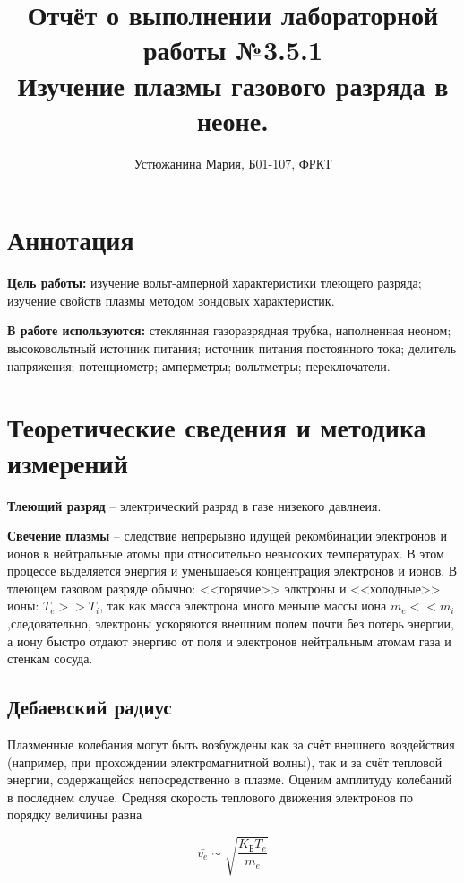 \documentclass [a4paper, 12pt]{article}
\title{Отчёт о выполнении лабораторной работы №3.5.1 \\ {Изучение плазмы газового разряда в неоне.}}
\author{Устюжанина Мария, Б01-107, ФРКТ}
\begin{document}
\maketitle
\newpage

\section{Аннотация}

    
    \textbf{Цель работы:} изучение вольт-амперной характеристики тлеющего разряда; изучение свойств плазмы методом зондовых характеристик.
    
    \textbf{В работе используются:} стеклянная газоразрядная трубка, наполненная неоном; высоковольтный источник питания; источник питания постоянного тока; делитель напряжения; потенциометр; амперметры; вольтметры; переключатели.




\section{Теоретические сведения и методика измерений}

    \textbf{Тлеющий разряд} -- электрический разряд в газе низекого давлнеия.
 
    \textbf{Свечение плазмы} -- следствие непрерывно идущей рекомбинации электронов и ионов в нейтральные атомы при относительно невысоких температурах. В этом процессе выделяется энергия и уменьшаеься концентрация электронов и ионов. В тлеющем газовом разряде обычно: <<горячие>> элктроны и <<холодные>> ионы: $T_e > > T_i$, так как масса электрона много меньше массы иона $m_e < < m_i$,следовательно, электроны ускоряются внешним полем почти без потерь энергии, а иону быстро отдают энергию от поля и электронов нейтральным атомам газа и стенкам сосуда.

\subsection*{Дебаевский радиус}

    Плазменные колебания могут быть возбуждены как за счёт внешнего воздействия (например, при прохождении электромагнитной волны), так и за счёт тепловой энергии, содержащейся непосредственно в плазме. Оценим амплитуду колебаний в последнем случае. Средняя скорость теплового движения электронов по порядку величины равна

\[ \bar{v_e} \sim \sqrt{\frac{K_{Б}T_e}{m_e}}\]
\end{document}
